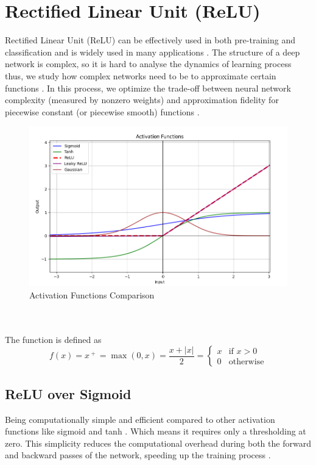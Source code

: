 \documentclass[conference]{IEEEtran}
\begin{document}
\section{Rectified Linear Unit (ReLU)}

Rectified Linear Unit (ReLU) can be effectively used in both pre-training and classification and is widely used in many applications \cite{b7}. The structure of a deep network is complex, so it is hard to analyse the dynamics of learning process thus, we study how complex networks need to be to approximate certain functions \cite{b7}. In this process, we optimize the trade-off between neural network complexity (measured by nonzero weights) and approximation fidelity for piecewise constant (or piecewise smooth) functions \cite{b7}.
\begin{figure}[h]
    \centering
    \includegraphics[width=\linewidth]{Activation Functions Compare.PNG}
    \caption{Activation Functions Comparison}
    \label{fig}
\end{figure}
\\
\\
The function is defined as
\[f(x) = x^{\ +\ } = \max(0,x) = \frac{x+|x|}{2} = \begin{cases}
    x & \text{if } x > 0 \\
    0 & \text{otherwise}
\end{cases}
\]

\subsection{ReLU over Sigmoid}

Being computationally simple and efficient compared to other activation functions like sigmoid and tanh \cite{b30}. Which means it requires only a thresholding at zero\cite{b30}. This simplicity reduces the computational overhead during both the forward and backward passes of the network, speeding up the training process \cite{b30}.
\end{document}
